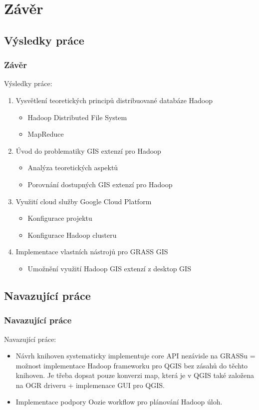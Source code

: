 \documentclass[unicode,bookmarksnumbered]{beamer}
\begin{document}
	\section{Závěr}
	\subsection{Výsledky práce}		
	\begin{frame}
		\frametitle{Závěr}
		Výsledky práce:
		\begin{enumerate}
			\item  Vysvětlení teoretických principů distribuované databáze Hadoop
				\begin{itemize}
					\item Hadoop Distributed File System
					\item MapReduce
				\end{itemize}
			\item Úvod do problematiky GIS extenzí pro Hadoop
				\begin{itemize}
					\item Analýza teoretických aspektů
					\item Porovnání dostupných GIS extenzí pro Hadoop
				\end{itemize}
			\item Využití cloud služby Google Cloud Platform
				\begin{itemize}
					\item Konfigurace projektu
					\item Konfigurace Hadoop clusteru
				\end{itemize}
			\item Implementace vlastních nástrojů pro GRASS GIS
				\begin{itemize}
					\item Umožnění využití Hadoop GIS extenzí z desktop GIS
				\end{itemize}
		\end{enumerate}
	\end{frame}
	
	\subsection{Navazující práce}	
	\begin{frame}
		\frametitle{Navazující práce}
		Navazující práce:
		\begin{itemize}
			\item Návrh knihoven systematicky implementuje core API nezávisle na GRASSu = možnost implementace Hadoop frameworku pro QGIS bez zásahů do těchto knihoven. Je třeba dopsat pouze konverzi map, která je v QGIS také založena na OGR driveru + implemenace GUI pro QGIS. 
			
			\item Implementace podpory Oozie workflow pro plánování Hadoop úloh.  
		\end{itemize}
	\end{frame}
	
\end{document}

